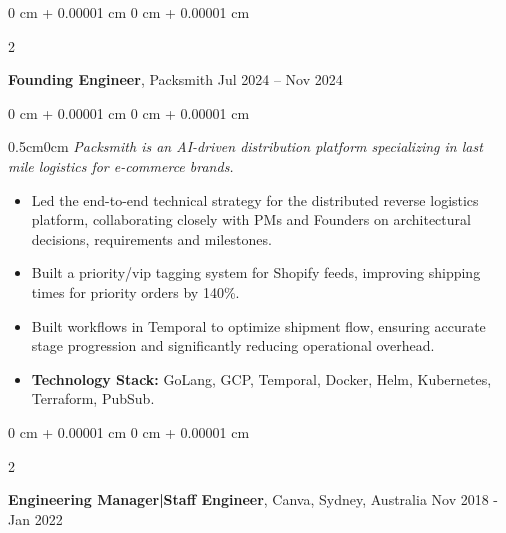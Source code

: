 \documentclass[10pt, letterpaper]{article}
\newenvironment{highlights}{
    \begin{itemize}[
        topsep=0.10 cm,
        parsep=0.10 cm,
        partopsep=0pt,
        itemsep=0pt,
        leftmargin=0 cm + 10pt
    ]
}{
    \end{itemize}
} %
\newenvironment{onecolentry}{
    \begin{adjustwidth}{
        0 cm + 0.00001 cm
    }{
        0 cm + 0.00001 cm
    }
}{
    \end{adjustwidth}
} %
\newenvironment{twocolentry}[2][]{
    \onecolentry
    \def\secondColumn{#2}
    \setcolumnwidth{\fill, 4.5 cm}
    \begin{paracol}{2}
}{
    \switchcolumn \raggedleft \secondColumn
    \end{paracol}
    \endonecolentry
} %
\begin{document}
        \vspace{0.15 cm}
        \begin{twocolentry}{
            Jul 2024 – Nov 2024
        }
        \textbf{Founding Engineer}, Packsmith\end{twocolentry}
        \vspace{0.10 cm}
        \begin{onecolentry}
            \begin{adjustwidth}{0.5cm}{0cm}
            \textit{Packsmith is an AI-driven distribution platform specializing in last mile logistics for e-commerce brands.}
            \end{adjustwidth}
            
            \vspace{0.10 cm}
            \begin{highlights}
                \item Led the end-to-end technical strategy for the distributed reverse logistics platform, collaborating closely with PMs and Founders on architectural decisions, requirements and milestones.
                \item Built a priority/vip tagging system for Shopify feeds, improving shipping times for priority orders by 140\%.
                \item Built workflows in Temporal to optimize shipment flow, ensuring accurate stage progression and significantly reducing operational overhead.
                \item \textbf{Technology Stack:} GoLang, GCP, Temporal, Docker, Helm, Kubernetes, Terraform, PubSub.
            \end{highlights}
        \end{onecolentry}
        
        \vspace{0.15 cm}

        \begin{twocolentry}{
            Nov 2018 - Jan 2022
        }
            \textbf{Engineering Manager|Staff Engineer}, Canva, Sydney, Australia\end{twocolentry}
\end{document}
